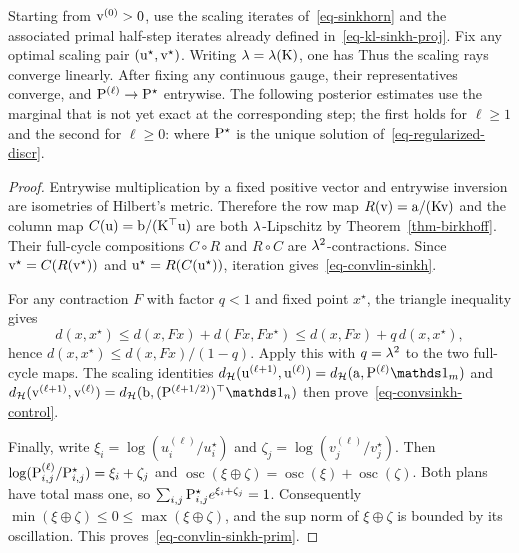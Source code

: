 \begin{thm}\label{thm-sinkhorn-hilbert-linear}
	Starting from $\vD^{(0)}>0$, use the scaling iterates of~\eqref{eq-sinkhorn} and the associated primal half-step iterates already defined in~\eqref{eq-kl-sinkh-proj}. Fix any optimal scaling pair $(\uD^\star,\vD^\star)$.
	Writing $\la=\la(\K)$, one has
	Thus the scaling rays converge linearly. After fixing any continuous gauge, their representatives converge, and $\P^{(\ell)}\to\P^\star$ entrywise. The following posterior estimates use the marginal that is not yet exact at the corresponding step; the first holds for $\ell\geq1$ and the second for $\ell\geq0$:
	where $\P^\star$ is the unique solution of~\eqref{eq-regularized-discr}.
\end{thm}

\begin{proof}
	Entrywise multiplication by a fixed positive vector and entrywise inversion are isometries of Hilbert's metric. Therefore the row map $R(\vD)=\a/(\K\vD)$ and the column map $C(\uD)=\b/(\K^\top\uD)$ are both $\la$-Lipschitz by Theorem~\ref{thm-birkhoff}. Their full-cycle compositions $C\circ R$ and $R\circ C$ are $\la^2$-contractions. Since $\vD^\star=C(R(\vD^\star))$ and $\uD^\star=R(C(\uD^\star))$, iteration gives~\eqref{eq-convlin-sinkh}.

	For any contraction $F$ with factor $q<1$ and fixed point $x^\star$, the triangle inequality gives
	\[
		d(x,x^\star)
		\leq
		d(x,Fx)+d(Fx,Fx^\star)
		\leq
		d(x,Fx)+q\,d(x,x^\star),
	\]
	hence $d(x,x^\star)\leq d(x,Fx)/(1-q)$. Apply this with $q=\la^2$ to the two full-cycle maps. The scaling identities
	\(
		\Hilbert(\uD^{(\ell+1)},\uD^{(\ell)})
		=\Hilbert(\a,\P^{(\ell)}\ones_m)
	\)
	and
	\(
		\Hilbert(\vD^{(\ell+1)},\vD^{(\ell)})
		=\Hilbert(\b,(\P^{(\ell+1/2)})^\top\ones_n)
	\)
	then prove~\eqref{eq-convsinkh-control}.

	Finally, write $\xi_i=\log(u_i^{(\ell)}/u_i^\star)$ and $\zeta_j=\log(v_j^{(\ell)}/v_j^\star)$. Then $\log(\P_{i,j}^{(\ell)}/\P_{i,j}^\star)=\xi_i+\zeta_j$ and $\operatorname{osc}(\xi\oplus\zeta)=\operatorname{osc}(\xi)+\operatorname{osc}(\zeta)$.
	Both plans have total mass one, so $\sum_{i,j}\P_{i,j}^\star e^{\xi_i+\zeta_j}=1$. Consequently $\min(\xi\oplus\zeta)\leq0\leq\max(\xi\oplus\zeta)$, and the sup norm of $\xi\oplus\zeta$ is bounded by its oscillation. This proves~\eqref{eq-convlin-sinkh-prim}.
\end{proof}

